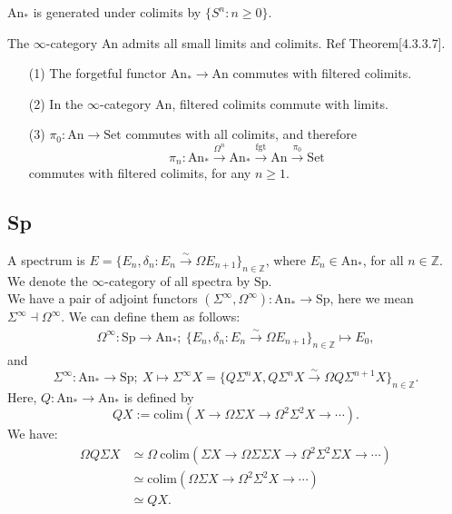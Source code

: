 \documentclass[UTF8,12,a4paper]{ctexart}
\theoremstyle{definition}
\newcommand{\An}{\text{An}}
\newcommand{\Sp}{\text{Sp}}
\begin{document}
\rem
$\An_*$ is generated under colimits by $\{S^n: n\geq 0\}.$

\prop 
The $\infty$-category $\An$ admits all small limits and colimits.
\pf Ref Theorem[4.3.3.7].

\prop 
\begin{itemize}
	\item [(1)]The forgetful functor $\An_*\rightarrow \An $ commutes with filtered colimits.
	\item [(2)]In the $\infty$-category $\An$, filtered colimits commute with limits.
	\item [(3)]
	$\pi_0:\An\rightarrow \text{Set}$ commutes with all colimits, and therefore 
	$$\pi_n:\An_*\stackrel{\Omega^n}{\longrightarrow} \An_*\stackrel{\text{fgt}}{\longrightarrow} \An\stackrel{\pi_0}{\longrightarrow} \text{Set}$$
	commutes with filtered colimits, for any $n\geq 1$.
\end{itemize}









\newpage
\subsection{Sp}
\dfn 
A spectrum is 
$E=\{E_n,\delta_n: E_n\stackrel{\sim}{\rightarrow}\Omega E_{n+1} \}_{n\in\mathbb{Z}}$, where $E_n\in \An_*$, for all $n\in\mathbb{Z}$. We denote the $\infty$-category of all spectra by $\Sp$.\\

We have a pair of adjoint functors 
$(\Sigma^\infty,\Omega^\infty):\An_*\rightarrow \Sp$, here we mean 
$\Sigma^\infty\dashv \Omega^\infty.$ We can define them as follows:
\begin{align*}
\Omega^\infty:\Sp\rightarrow \An_*;\  
 \{E_n,\delta_n: E_n\stackrel{\sim}{\rightarrow}\Omega E_{n+1} \}_{n\in\mathbb{Z}}\mapsto E_0,
\end{align*}
and
$$
\Sigma^\infty:\An_*\rightarrow \Sp;\ 
X\mapsto\Sigma^\infty X=\{Q\Sigma^n X, Q\Sigma^n X\stackrel{\sim}{\rightarrow}\Omega Q\Sigma^{n+1} X\}_{n\in \mathbb{Z}}.
$$
Here, $Q:\An_*\rightarrow \An_*$ is defined by
$$
QX:=\text{colim}(X\rightarrow \Omega\Sigma X\rightarrow \Omega^2\Sigma^2 X\rightarrow\cdots).
$$
\rem
We have:
\begin{align*}
\Omega Q\Sigma X
&\simeq \Omega\ \text{colim}(\Sigma X \rightarrow \Omega\Sigma \Sigma X\rightarrow \Omega^2\Sigma^2 \Sigma X\rightarrow\cdots)\\
&\simeq \text{colim} ( \Omega\Sigma X\rightarrow \Omega^2\Sigma^2 X\rightarrow\cdots)\\
&\simeq QX.
\end{align*}
\end{document}
